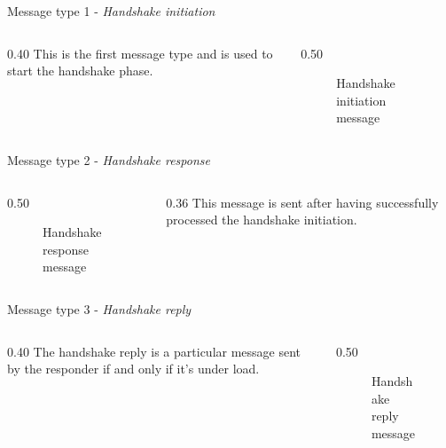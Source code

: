 \documentclass[light]{presenta}
\begin{document}
\begin{frame}{Message type 1 - \textit{Handshake initiation}}
  \begin{columns}
    \hspace{0.05\paperwidth}
    \begin{column}{0.40\paperwidth}
      \justifying
      This is the first message type and is used to start the handshake phase.
    \end{column}
    \hspace{10pt}
    \begin{column}{0.50\paperwidth}
      \begin{figure}[H]
        
        \caption{Handshake initiation message}
      \end{figure}
    \end{column}
  \end{columns}
\end{frame}

\begin{frame}{Message type 2 - \textit{Handshake response}}
  \begin{columns}
    \begin{column}{0.50\paperwidth}
      \begin{figure}[H]
        
        \caption{Handshake response message}
      \end{figure}
    \end{column}
    \begin{column}{0.36\paperwidth}
      \justifying
      This message is sent after having successfully processed the handshake initiation.
    \end{column}
  \end{columns}
\end{frame}

\begin{frame}{Message type 3 - \textit{Handshake reply}}
  \begin{columns}
    \hspace{0.05\paperwidth}
    \begin{column}{0.40\paperwidth}
      \justifying
      The handshake reply is a particular message sent by the responder if and only if it's under load.
    \end{column}
    \hspace{10pt}
    \begin{column}{0.50\paperwidth}
      \begin{figure}[H]
        
        \caption{Handshake reply message}
      \end{figure}
    \end{column}
  \end{columns}
\end{frame}
\end{document}
